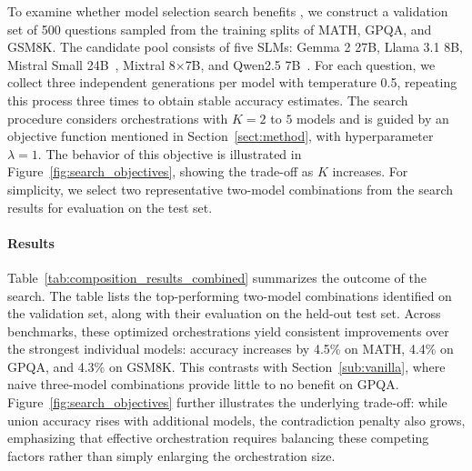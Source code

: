 

To examine whether model selection search benefits \NAME{}, we construct a validation set of 500 questions sampled from the training splits of MATH, GPQA, and GSM8K. The candidate pool consists of five SLMs: Gemma 2 27B, Llama 3.1 8B, Mistral Small 24B~\citep{mistral_small_24b_instruct}, Mixtral 8$\times$7B, and Qwen2.5 7B~\citep{qwen2025qwen25technicalreport}. For each question, we collect three independent generations per model with temperature 0.5, repeating this process three times to obtain stable accuracy estimates.
The search procedure considers orchestrations with $K=2$ to $5$ models and is guided by an objective function mentioned in Section~\ref{sect:method}, with hyperparameter $\lambda=1$. The behavior of this objective is illustrated in Figure~\ref{fig:search_objectives}, showing the trade-off as $K$ increases. For simplicity, we select two representative two-model combinations from the search results for evaluation on the test set.

\paragraph{Results} Table~\ref{tab:composition_results_combined} summarizes the outcome of the search. The table lists the top-performing two-model combinations identified on the validation set, along with their evaluation on the held-out test set. Across benchmarks, these optimized orchestrations yield consistent improvements over the strongest individual models: accuracy increases by 4.5\% on MATH, 4.4\% on GPQA, and 4.3\% on GSM8K. This contrasts with Section~\ref{sub:vanilla}, where naive three-model combinations provide little to no benefit on GPQA. Figure~\ref{fig:search_objectives} further illustrates the underlying trade-off: while union accuracy rises with additional models, the contradiction penalty also grows, emphasizing that effective orchestration requires balancing these competing factors rather than simply enlarging the orchestration size.



